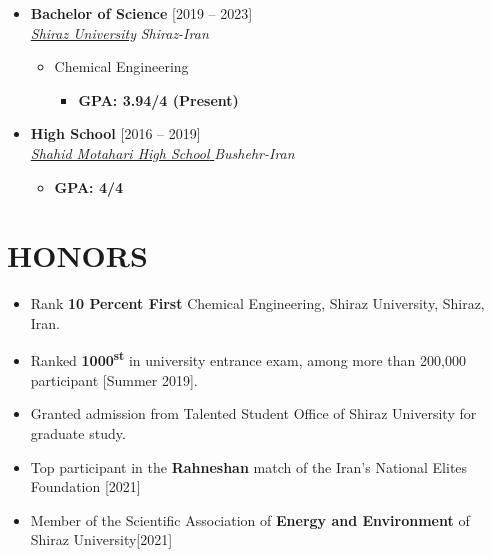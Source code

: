 \documentclass[10pt,a4paper,sans]{moderncv} %
\begin{document}
	\begin{itemize}

		\item \textbf{Bachelor of Science} \hfill [2019 -- 2023] \\
		\href{https://cpe.shirazu.ac.ir/}{ \emph{Shiraz University}} \hfill \emph{Shiraz-Iran}
		
		\begin{itemize}
			\item Chemical Engineering
			\begin{itemize}		
				 
				   
				\item\textbf{GPA: 3.94/4 (Present)}
			\end{itemize}
		\end{itemize}
		
		
		\vspace{0.71 em}
		
		\item \textbf{High School} \hfill [2016 -- 2019] \\
		\href{}{ \emph{Shahid Motahari High School }} \hfill \emph{Bushehr-Iran}
		
		\begin{itemize}
			\begin{itemize}		
				
				\item\textbf{GPA: 4/4}
			\end{itemize}
		\end{itemize}
		
		
		
		
	\end{itemize}
	
	\vspace{-0.9em}
	\section{HONORS}
	
	\begin{itemize}
		\item  Rank \textbf{10 Percent First} Chemical Engineering,
		Shiraz University, Shiraz, Iran.
		\item Ranked \textbf {1000\textsuperscript{st} } in university entrance exam, among more than 200,000
		participant [Summer 2019].
		
		\item Granted admission from Talented Student Office of Shiraz University for graduate study. 
		
		\item Top participant in the \textbf{Rahneshan} match of the Iran's National Elites Foundation [2021] 
		
		\item Member of the Scientific Association of \textbf {Energy and Environment} of Shiraz University[2021] 
		
		
	\end{itemize}
	
\end{document}
